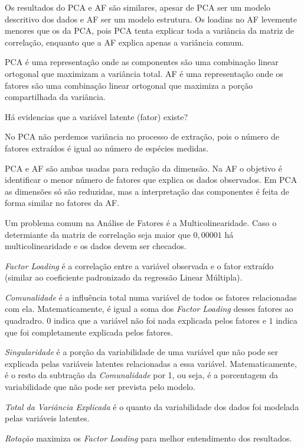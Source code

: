 Os resultados do PCA e AF são similares, apesar de PCA ser um modelo
descritivo dos dados e AF ser um modelo estrutura. 
Os loadins no AF levemente menores que os da PCA, pois PCA tenta
explicar toda a variância da matriz de correlação, enquanto que a AF
explica apenas a variância comum. 

PCA é uma representação onde as componentes são uma combinação linear 
ortogonal que maximizam a variância total.
AF é uma representação onde os fatores são uma combinação linear ortogonal
que maximiza a porção compartilhada da variância. 

Há evidencias que a variável latente (fator) existe?

No PCA não perdemos variância no processo de extração, pois 
o número de fatores extraídos é igual ao número de espécies medidas.

PCA e AF são ambas usadas para redução da dimensão. 
Na AF o objetivo é identificar o menor número de fatores que explica os 
dados observados. Em PCA as dimensões só são reduzidas, mas a 
interpretação das componentes é feita de forma similar no fatores da AF.

Um problema comum na Análise de Fatores é a Multicolinearidade. 
Caso o determiante da matriz de correlação seja maior que $0,00001$ 
há multicolinearidade e os dados devem ser checados. 

\textit{Factor Loading} é a correlação entre a variável observada e o fator
extraído (similar ao coeficiente padronizado da regressão Linear Múltipla). 

\textit{Comunalidade} é a influência total numa variável de todos os fatores 
relacionadas com ela. Matematicamente, é igual a soma dos \textit{Factor Loading}
desses fatores ao quadradro. 
$0$ indica que a variável não foi nada explicada pelos fatores e $1$ indica 
que foi completamente explicada pelos fatores. 

\textit{Singularidade} é a porção da variabilidade de uma variável que não 
pode ser explicada pelas variáveis latentes relacionadas a essa variável. 
Matematicamente, é o resto da subtração da \textit{Comunalidade} por 1,
ou seja, é a porcentagem da variabilidade que não pode ser prevista pelo modelo.

\textit{Total da Variância Explicada} é o quanto da variabilidade dos dados foi 
modelada pelas variáveis latentes. 

\textit{Rotação} maximiza os \textit{Factor Loading} para melhor 
entendimento dos resultados. 

